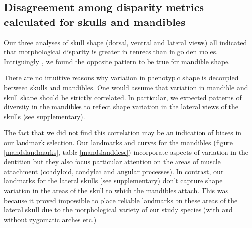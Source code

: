 \documentclass[12pt,a4paper]{article}
\begin{document}
\subsection{Disagreement among disparity metrics calculated for skulls and mandibles}

Our three analyses of skull shape (dorsal, ventral and lateral views) all indicated that morphological disparity is greater in tenrecs than in golden moles. Intriguingly %
, we found the opposite pattern to be true for mandible shape.

There are no intuitive reasons why variation in phenotypic shape is decoupled between skulls and mandibles. One would assume that variation in mandible and skull shape should be strictly correlated. In particular, we expected patterns of diversity in the mandibles to reflect shape variation in the lateral views of the skulls (see supplementary). %

The fact that we did not find this correlation may be an indication of biases in our landmark selection. Our landmarks and curves for the mandibles (figure \ref{mandslandmarks}, table \ref{mandslanddesc}) incorporate aspects of variation in the dentition but they also focus particular attention on the areas of muscle attachment (condyloid, condylar and angular processes). In contrast, our landmarks for the lateral skulls (see supplementary) don't capture shape variation in the areas of the skull to which the mandibles attach. This was because it proved impossible to place reliable landmarks on these areas of the lateral skull due to the morphological variety of our study species (with and without zygomatic arches etc.)




\end{document}
